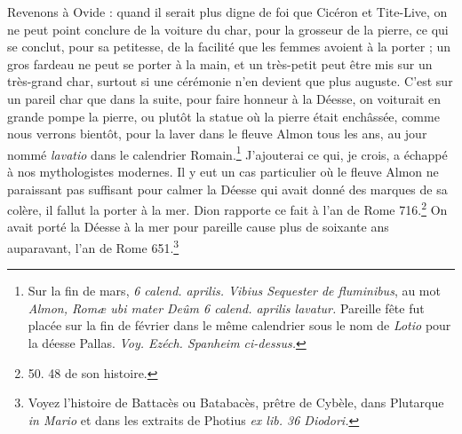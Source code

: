 \documentclass[a4paper, 11pt, oneside, polutonikogreek, french]{article}
\begin{document}
Revenons à Ovide : quand il serait plus digne de foi que Cicéron et Tite-Live, on ne peut point conclure de la voiture du char, pour la grosseur de la pierre, ce qui se conclut, pour sa petitesse, de la facilité que les femmes avoient à la porter ; un gros fardeau ne peut se porter à la main, et un très-petit peut être mis sur un très-grand char, surtout si une cérémonie n'en devient que plus auguste. C'est sur un pareil char que dans la suite, pour faire honneur à la Déesse, on voiturait en grande pompe la pierre, ou plutôt la statue où la pierre était enchâssée, comme nous verrons bientôt, pour la laver dans le fleuve Almon tous les ans, au jour nommé \emph{lavatio} dans le calendrier Romain.\footnote{Sur la fin de mars, \emph{6 calend. aprilis. Vibius Sequester de fluminibus}, au mot \emph{Almon, Romæ ubi mater Deûm 6 calend. aprilis lavatur.} Pareille fête fut placée sur la fin de février dans le même calendrier sous le nom de \emph{Lotio} pour la déesse Pallas. \emph{Voy. Ezéch. Spanheim ci-dessus.}} J'ajouterai ce qui, je crois, a échappé à nos mythologistes modernes. Il y eut un cas particulier où le fleuve Almon ne paraissant pas suffisant pour calmer la Déesse qui avait donné des marques de sa colère, il fallut la porter à la mer. Dion rapporte ce fait à l'an de Rome 716.\footnote{50. 48 de son histoire.} On avait porté la Déesse à la mer pour pareille cause plus de soixante ans auparavant, l'an de Rome 651.\footnote{Voyez l'histoire de Battacès ou Batabacès, prêtre de Cybèle, dans Plutarque \emph{in Mario} et dans les extraits de Photius \emph{ex lib. 36 Diodori.}}
\end{document}
